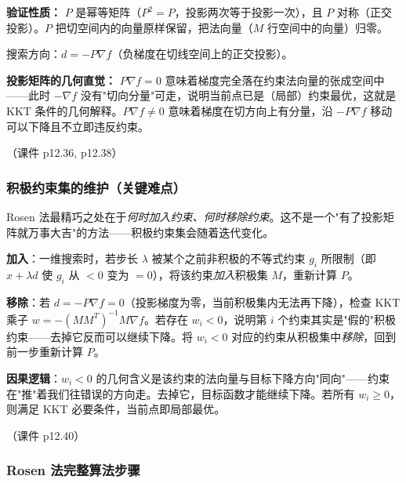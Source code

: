 \textbf{验证性质：} $P$ 是幂等矩阵（$P^2=P$，投影两次等于投影一次），且 $P$ 对称（正交投影）。$P$ 把切空间内的向量原样保留，把法向量（$M$ 行空间中的向量）归零。

搜索方向：$d = -P \nabla f$（负梯度在切线空间上的正交投影）。

\textbf{投影矩阵的几何直觉：} $P \nabla f = 0$ 意味着梯度完全落在约束法向量的张成空间中——此时 $-\nabla f$ 没有"切向分量"可走，说明当前点已是（局部）约束最优，这就是 KKT 条件的几何解释。$P \nabla f \neq 0$ 意味着梯度在切方向上有分量，沿 $-P\nabla f$ 移动可以下降且不立即违反约束。

（课件 p12.36, p12.38）

\subsubsection{积极约束集的维护（关键难点）}

Rosen 法最精巧之处在于\emph{何时加入约束、何时移除约束}。这不是一个"有了投影矩阵就万事大吉"的方法——积极约束集会随着迭代变化。

\textbf{加入}：一维搜索时，若步长 $\lambda$ 被某个之前非积极的不等式约束 $g_i$ 所限制（即 $x + \lambda d$ 使 $g_i$ 从 $<0$ 变为 $=0$），将该约束\emph{加入}积极集 $M$，重新计算 $P$。

\textbf{移除}：若 $d = -P\nabla f = 0$（投影梯度为零，当前积极集内无法再下降），检查 KKT 乘子 $w = -(MM^T)^{-1}M \nabla f$。若存在 $w_i < 0$，说明第 $i$ 个约束其实是"假的"积极约束——去掉它反而可以继续下降。将 $w_i < 0$ 对应的约束从积极集中\emph{移除}，回到前一步重新计算 $P$。

\textbf{因果逻辑}：$w_i < 0$ 的几何含义是该约束的法向量与目标下降方向"同向"——约束在"推"着我们往错误的方向走。去掉它，目标函数才能继续下降。若所有 $w_i \ge 0$，则满足 KKT 必要条件，当前点即局部最优。

（课件 p12.40）

\subsubsection{Rosen 法完整算法步骤}

